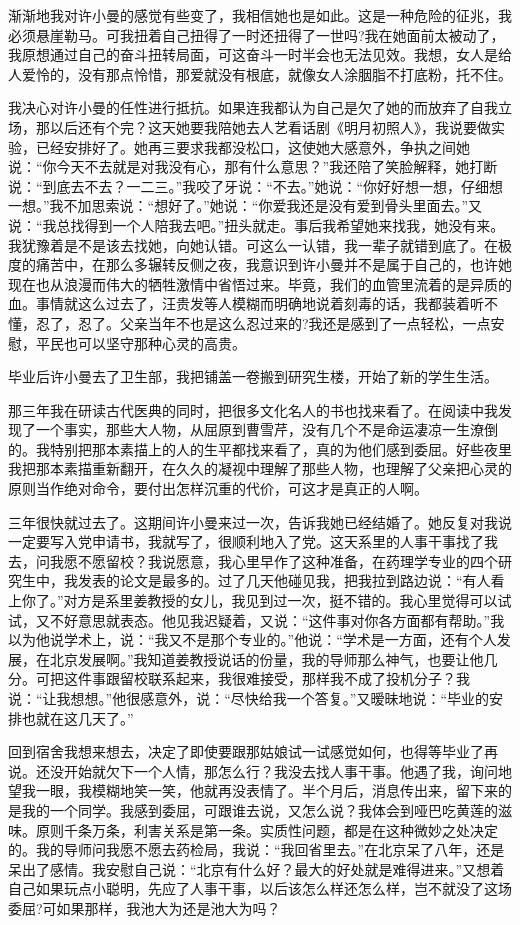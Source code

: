 \documentclass[12pt,oneside]{book}
\begin{document}
渐渐地我对许小曼的感觉有些变了，我相信她也是如此。这是一种危险的征兆，我必须悬崖勒马。可我扭着自己扭得了一时还扭得了一世吗?我在她面前太被动了，我原想通过自己的奋斗扭转局面，可这奋斗一时半会也无法见效。我想，女人是给人爱怜的，没有那点怜惜，那爱就没有根底，就像女人涂胭脂不打底粉，托不住。

我决心对许小曼的任性进行抵抗。如果连我都认为自己是欠了她的而放弃了自我立场，那以后还有个完？这天她要我陪她去人艺看话剧《明月初照人》，我说要做实验，已经安排好了。她再三要求我都没松口，这使她大感意外，争执之间她说：``你今天不去就是对我没有心，那有什么意思？''我还陪了笑脸解释，她打断说：``到底去不去？一二三。''我咬了牙说：``不去。''她说：``你好好想一想，仔细想一想。''我不加思索说：``想好了。''她说：``你爱我还是没有爱到骨头里面去。''又说：``我总找得到一个人陪我去吧。''扭头就走。事后我希望她来找我，她没有来。我犹豫着是不是该去找她，向她认错。可这么一认错，我一辈子就错到底了。在极度的痛苦中，在那么多辗转反侧之夜，我意识到许小曼并不是属于自己的，也许她现在也从浪漫而伟大的牺牲激情中省悟过来。毕竟，我们的血管里流着的是异质的血。事情就这么过去了，汪贵发等人模糊而明确地说着刻毒的话，我都装着听不懂，忍了，忍了。父亲当年不也是这么忍过来的?我还是感到了一点轻松，一点安慰，平民也可以坚守那种心灵的高贵。

毕业后许小曼去了卫生部，我把铺盖一卷搬到研究生楼，开始了新的学生生活。

那三年我在研读古代医典的同时，把很多文化名人的书也找来看了。在阅读中我发现了一个事实，那些大人物，从屈原到曹雪芹，没有几个不是命运凄凉一生潦倒的。我特别把那本素描上的人的生平都找来看了，真的为他们感到委屈。好些夜里我把那本素描重新翻开，在久久的凝视中理解了那些人物，也理解了父亲把心灵的原则当作绝对命令，要付出怎样沉重的代价，可这才是真正的人啊。

三年很快就过去了。这期间许小曼来过一次，告诉我她已经结婚了。她反复对我说一定要写入党申请书，我就写了，很顺利地入了党。这天系里的人事干事找了我去，问我愿不愿留校？我说愿意，我心里早作了这种准备，在药理学专业的四个研究生中，我发表的论文是最多的。过了几天他碰见我，把我拉到路边说：``有人看上你了。''对方是系里姜教授的女儿，我见到过一次，挺不错的。我心里觉得可以试试，又不好意思就表态。他见我迟疑着，又说：``这件事对你各方面都有帮助。''我以为他说学术上，说：``我又不是那个专业的。''他说：``学术是一方面，还有个人发展，在北京发展啊。''我知道姜教授说话的份量，我的导师那么神气，也要让他几分。可把这件事跟留校联系起来，我很难接受，那样我不成了投机分子？我说：``让我想想。''他很感意外，说：``尽快给我一个答复。''又暧昧地说：``毕业的安排也就在这几天了。''

回到宿舍我想来想去，决定了即使要跟那姑娘试一试感觉如何，也得等毕业了再说。还没开始就欠下一个人情，那怎么行？我没去找人事干事。他遇了我，询问地望我一眼，我模糊地笑一笑，他就再没表情了。半个月后，消息传出来，留下来的是我的一个同学。我感到委屈，可跟谁去说，又怎么说？我体会到哑巴吃黄莲的滋味。原则千条万条，利害关系是第一条。实质性问题，都是在这种微妙之处决定的。我的导师问我愿不愿去药检局，我说：``我回省里去。''在北京呆了八年，还是呆出了感情。我安慰自己说：``北京有什么好？最大的好处就是难得进来。''又想着自己如果玩点小聪明，先应了人事干事，以后该怎么样还怎么样，岂不就没了这场委屈?可如果那样，我池大为还是池大为吗？
\end{document}
